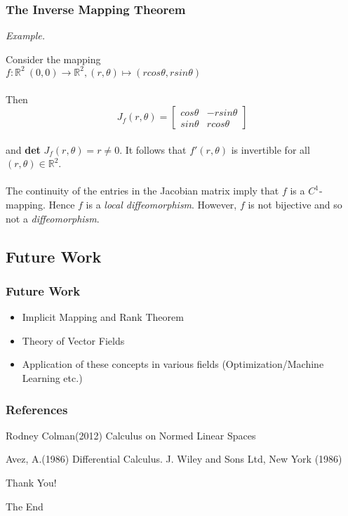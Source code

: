 \documentclass{beamer}
\newcommand{\R}{\mathbb{R}}
\begin{document}
\begin{frame}
\frametitle{The Inverse Mapping Theorem}
\textit{Example.}

Consider the mapping\\

\hspace{15mm} $f : \R^2 \ {(0,0)} \to \R^2, (r, \theta) \mapsto (r cos \theta, r sin \theta)$\\~\\

Then\\
\hspace{3cm} \[
J_f(r, \theta)=
  \begin{bmatrix}
    cos \theta & -r sin\theta \\
    sin \theta & r cos \theta
  \end{bmatrix}
\]
\\

and \textbf{det} $J_f(r, \theta) = r \neq 0$. It follows that $f'(r, \theta)$ is invertible for all $(r, \theta) \in \R^2$.\\~\\

The continuity of the entries in the Jacobian matrix imply that $f$ is a $C^1$-mapping. Hence $f$ is a \textit{local diffeomorphism}. However, $f$ is not bijective and so not a \textit{diffeomorphism}.  

\end{frame}

\subsection{Future Work}

\begin{frame}
\frametitle{Future Work}
\begin{itemize}
\item Implicit Mapping and Rank Theorem
\item Theory of Vector Fields
\item Application of these concepts in various fields (Optimization/Machine Learning etc.)

\end{itemize}
\end{frame}
\begin{frame}
\frametitle{References}
\footnotesize{
\begin{thebibliography}{99} %
 Rodney Colman(2012)
\newblock Calculus on Normed Linear Spaces

 Avez, A.(1986)
\newblock  Differential Calculus. J. Wiley and Sons Ltd, New York (1986)
\end{thebibliography}
}
\end{frame}





\begin{frame}
\Large{\centerline{Thank You!}}
\small{\centerline{The End}}
\end{frame}

\end{document}
